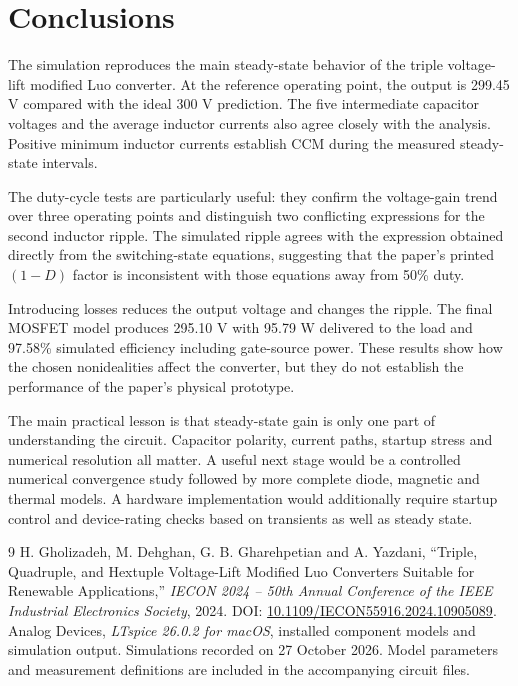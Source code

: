 \documentclass[11pt,a4paper]{article}
\begin{document}
\section{Conclusions}
The simulation reproduces the main steady-state behavior of the triple voltage-lift modified Luo converter. At the reference operating point, the output is 299.45 V compared with the ideal 300 V prediction. The five intermediate capacitor voltages and the average inductor currents also agree closely with the analysis. Positive minimum inductor currents establish CCM during the measured steady-state intervals.

The duty-cycle tests are particularly useful: they confirm the voltage-gain trend over three operating points and distinguish two conflicting expressions for the second inductor ripple. The simulated ripple agrees with the expression obtained directly from the switching-state equations, suggesting that the paper's printed $(1-D)$ factor is inconsistent with those equations away from 50\% duty.

Introducing losses reduces the output voltage and changes the ripple. The final MOSFET model produces 295.10 V with 95.79 W delivered to the load and 97.58\% simulated efficiency including gate-source power. These results show how the chosen nonidealities affect the converter, but they do not establish the performance of the paper's physical prototype.

The main practical lesson is that steady-state gain is only one part of understanding the circuit. Capacitor polarity, current paths, startup stress and numerical resolution all matter. A useful next stage would be a controlled numerical convergence study followed by more complete diode, magnetic and thermal models. A hardware implementation would additionally require startup control and device-rating checks based on transients as well as steady state.
\begin{thebibliography}{9}
 H. Gholizadeh, M. Dehghan, G. B. Gharehpetian and A. Yazdani, ``Triple, Quadruple, and Hextuple Voltage-Lift Modified Luo Converters Suitable for Renewable Applications,'' \emph{IECON 2024 -- 50th Annual Conference of the IEEE Industrial Electronics Society}, 2024. DOI: \href{https://doi.org/10.1109/IECON55916.2024.10905089}{10.1109/IECON55916.2024.10905089}.
 Analog Devices, \emph{LTspice 26.0.2 for macOS}, installed component models and simulation output. Simulations recorded on 27 October 2026. Model parameters and measurement definitions are included in the accompanying circuit files.
\end{thebibliography}
\clearpage
\appendix
\end{document}
